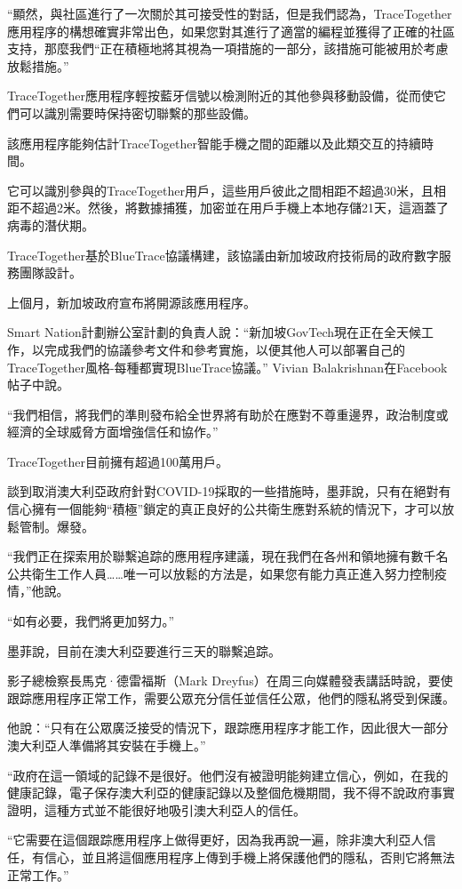 \documentclass[12pt, a4paper]{report}
\begin{document}
“顯然，與社區進行了一次關於其可接受性的對話，但是我們認為，TraceTogether應用程序的構想確實非常出色，如果您對其進行了適當的編程並獲得了正確的社區支持，那麼我們“正在積極地將其視為一項措施的一部分，該措施可能被用於考慮放鬆措施。”

TraceTogether應用程序輕按藍牙信號以檢測附近的其他參與移動設備，從而使它們可以識別需要時保持密切聯繫的那些設備。

該應用程序能夠估計TraceTogether智能手機之間的距離以及此類交互的持續時間。

它可以識別參與的TraceTogether用戶，這些用戶彼此之間相距不超過30米，且相距不超過2米。然後，將數據捕獲，加密並在用戶手機上本地存儲21天，這涵蓋了病毒的潛伏期。

TraceTogether基於BlueTrace協議構建，該協議由新加坡政府技術局的政府數字服務團隊設計。

上個月，新加坡政府宣布將開源該應用程序。

Smart Nation計劃辦公室計劃的負責人說：“新加坡GovTech現在正在全天候工作，以完成我們的協議參考文件和參考實施，以便其他人可以部署自己的TraceTogether風格-每種都實現BlueTrace協議。” Vivian Balakrishnan在Facebook帖子中說。

“我們相信，將我們的準則發布給全世界將有助於在應對不尊重邊界，政治制度或經濟的全球威脅方面增強信任和協作。”

TraceTogether目前擁有超過100萬用戶。

談到取消澳大利亞政府針對COVID-19採取的一些措施時，墨菲說，只有在絕對有信心擁有一個能夠“積極”鎖定的真正良好的公共衛生應對系統的情況下，才可以放鬆管制。爆發。

“我們正在探索用於聯繫追踪的應用程序建議，現在我們在各州和領地擁有數千名公共衛生工作人員……唯一可以放鬆的方法是，如果您有能力真正進入努力控制疫情，”他說。

“如有必要，我們將更加努力。”

墨菲說，目前在澳大利亞要進行三天的聯繫追踪。

影子總檢察長馬克·德雷福斯（Mark Dreyfus）在周三向媒體發表講話時說，要使跟踪應用程序正常工作，需要公眾充分信任並信任公眾，他們的隱私將受到保護。

他說：“只有在公眾廣泛接受的情況下，跟踪應用程序才能工作，因此很大一部分澳大利亞人準備將其安裝在手機上。”

“政府在這一領域的記錄不是很好。他們沒有被證明能夠建立信心，例如，在我的健康記錄，電子保存澳大利亞的健康記錄以及整個危機期間，我不得不說政府事實證明，這種方式並不能很好地吸引澳大利亞人的信任。

“它需要在這個跟踪應用程序上做得更好，因為我再說一遍，除非澳大利亞人信任，有信心，並且將這個應用程序上傳到手機上將保護他們的隱私，否則它將無法正常工作。”
\end{document}

